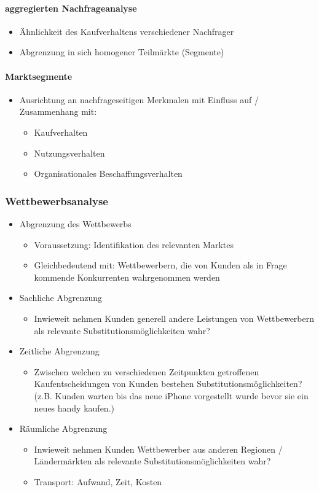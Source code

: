 \paragraph{aggregierten Nachfrageanalyse}
\begin{itemize}
	\item Ähnlichkeit des Kaufverhaltens verschiedener Nachfrager
	\item Abgrenzung in sich homogener Teilmärkte (Segmente)
\end{itemize}

\paragraph{Marktsegmente}
\begin{itemize}
	\item Ausrichtung an nachfrageseitigen Merkmalen mit Einfluss auf /	Zusammenhang mit:
	\begin{itemize}
		\item Kaufverhalten
		\item Nutzungsverhalten
		\item Organisationales Beschaffungsverhalten
	\end{itemize}
\end{itemize}

\subsubsection{Wettbewerbsanalyse}
\begin{itemize}
	\item Abgrenzung des Wettbewerbs
	\begin{itemize}
		\item Voraussetzung: Identifikation des relevanten Marktes
		\item Gleichbedeutend mit: Wettbewerbern, die von Kunden als in Frage kommende Konkurrenten wahrgenommen werden
	\end{itemize}
	\item  Sachliche Abgrenzung
	\begin{itemize}
		\item Inwieweit nehmen Kunden generell andere Leistungen von Wettbewerbern als relevante Substitutionsmöglichkeiten wahr?
	\end{itemize}
	\item  Zeitliche Abgrenzung
	\begin{itemize}
		\item Zwischen welchen zu verschiedenen Zeitpunkten getroffenen Kaufentscheidungen von Kunden bestehen Substitutionsmöglichkeiten? (z.B. Kunden warten bis das neue iPhone vorgestellt wurde bevor sie ein neues handy kaufen.)
	\end{itemize}
	\item  Räumliche Abgrenzung
	\begin{itemize}
		\item Inwieweit nehmen Kunden Wettbewerber aus anderen Regionen / Ländermärkten als relevante Substitutionsmöglichkeiten wahr?
		\item Transport: Aufwand, Zeit, Kosten
	\end{itemize}
\end{itemize}

